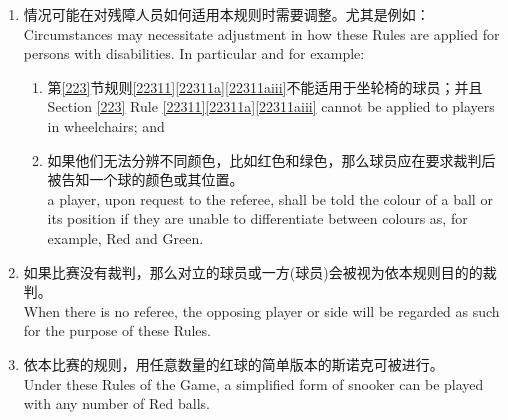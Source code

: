 \begin{enumerate}
    \item 情况可能在对残障人员如何适用本规则时需要调整。尤其是例如：\\
    Circumstances may necessitate adjustment in how these Rules are applied for persons with disabilities. In particular and for example:
    \begin{enumerate}
        \item 第\ref{223}节规则\ref{22311}\ref{22311a}\ref{22311aiii}不能适用于坐轮椅的球员；并且\\
        Section \ref{223} Rule \ref{22311}\ref{22311a}\ref{22311aiii} cannot be applied to players in wheelchairs; and
        \item 如果他们无法分辨不同颜色，比如红色和绿色，那么球员应在要求裁判后被告知一个球的颜色或其位置。\\
        a player, upon request to the referee, shall be told the colour of a ball or its position if they are unable to differentiate between colours as, for example, Red and Green.
    \end{enumerate}
    \item 如果比赛没有裁判，那么对立的球员或一方(球员)会被视为依本规则目的的裁判。\\
    When there is no referee, the opposing player or side will be regarded as such for the purpose of these Rules.
    \item 依本比赛的规则，用任意数量的红球的简单版本的斯诺克可被进行。\\
    Under these Rules of the Game, a simplified form of snooker can be played with any number of Red balls.
\end{enumerate}
